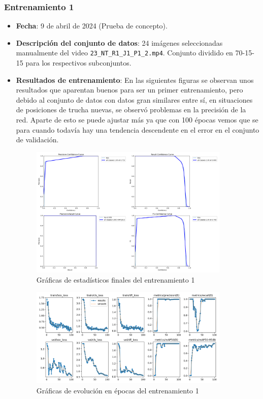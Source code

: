 \subsubsection*{Entrenamiento 1}
\label{train:1}
\begin{itemize}
    \item \textbf{Fecha}: 9 de abril de 2024 (Prueba de concepto).
    \item \textbf{Descripción del conjunto de datos}: 24 imágenes seleccionadas manualmente del video \verb|23_NT_R1_J1_P1_2.mp4|. Conjunto dividido en 70-15-15 para los respectivos subconjuntos.
    \item \textbf{Resultados de entrenamiento}: En las siguientes figuras se observan  unos resultados que aparentan buenos  para ser un primer entrenamiento, pero debido al conjunto de datos con datos gran similares entre sí, en 
    situaciones de posiciones de trucha nuevas, se observó problemas en la precisión de la red. Aparte de esto se puede ajustar más ya que con 100 épocas vemos que se para cuando todavía hay una tendencia 
    descendente en el error en el conjunto de validación.
    
    \begin{figure}[H]
        \centering
        \includegraphics[width=0.9\textwidth]{images/13/b/1/PR.png}
        \caption{Gráficas de estadísticos finales del entrenamiento 1}
        \label{fig:Estadisticos1}
    \end{figure}
    \begin{figure}[H]
        \centering
        \includegraphics[width=0.9\textwidth]{images/13/b/1/results.png}
        \caption{Gráficas de evolución en épocas del entrenamiento 1}
        \label{fig:Resultados1}
    \end{figure}
\end{itemize}
